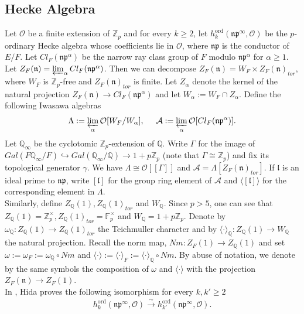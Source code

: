 \documentclass[reqno,10pt]{amsart}
\newcommand{\zp}{\mathbb{Z}_{p}}
\newcommand{\q}{\mathbb{Q}}
\newcommand{\mcO}{\mathcal{O}}
\newcommand{\mcA}{\mathcal{A}}
\newcommand{\p}{\mathfrak{p}}
\newcommand{\n}{\mathfrak{n}}
\newcommand{\ml}{\mathfrak{l}}
\theoremstyle{plain}
\theoremstyle{definition}
\begin{document}
\subsection{Hecke Algebra} \label{HeckeAlgebra}
Let $\mcO$ be a finite extension of $\zp$ and for every $k \geq 2$, let $h_{k}^{\mathrm{ord}}(\n\p^\infty,\mcO)$ be the $p$-ordinary Hecke algebra whose coefficients lie in $\mcO$, where $\n\p$ is the conductor of $E/F$. Let $Cl_F(\n\p^\alpha)$ be the narrow ray class group of $F$ modulo $\n\p^\alpha$ for $\alpha \geq 1$. Let $Z_F(\n) = \varprojlim_{\alpha} Cl_F(\n\p^\alpha)$. Then we can decompose $Z_F(\n) = W_F \times Z_F(\n)_{tor}$, where $W_F$ is $\zp$-free and $Z_F(\n)_{tor}$ is finite. Let $Z_\alpha$ denote the kernel of the natural projection $Z_F(\n) \rightarrow Cl_F(\n\p^\alpha)$ and let $W_\alpha := W_F \cap Z_\alpha$. Define the following Iwasawa algebras
\begin{align*}
    \Lambda := \varprojlim_{\alpha} \mcO[W_F/W_\alpha], \hspace{5mm} \mcA := \varprojlim_{\alpha} \mcO[Cl_F(\n\p^\alpha)].
\end{align*}
Let $\q_\infty$ be the cyclotomic $\zp$-extension of $\q$. Write $\Gamma$ for the image of $Gal(F\q_\infty/F) \hookrightarrow Gal(\q_\infty/\q) \rightarrow 1+p\zp$ (note that $\Gamma \cong \zp$) and fix its topological generator $\gamma$. We have $\Lambda \cong \mcO[[\Gamma]]$ and $\mcA = \Lambda[Z_F(\n)_{tor}]$. If $\ml$ is an ideal prime to $\n\p$, write $[\ml]$ for the group ring element of $\mcA$ and $\langle [\ml] \rangle$ for the corresponding element in $\Lambda$.
\\
Similarly, define $Z_\q(1), Z_\q(1)_{tor}$ and $W_\q$. Since $p > 5$, one can see that $Z_\q(1) = \zp^\times, Z_\q(1)_{tor} = \mathbb{F}_p^\times$ and $W_\q = 1+p\zp$. Denote by $\omega_\q : Z_\q(1) \rightarrow Z_\q(1)_{tor}$ the Teichmuller character and by $\langle \cdot \rangle_\q : Z_\q(1) \rightarrow W_\q$ the natural projection. Recall the norm map, $Nm : Z_F(1) \rightarrow Z_\q(1)$ and set $\omega := \omega_F := \omega_\q \circ Nm$ and $\langle \cdot \rangle := \langle \cdot \rangle_F := \langle \cdot \rangle_\q \circ Nm$. By abuse of notation, we denote by the same symbols the composition of $\omega$ and $\langle \cdot \rangle$ with the projection $Z_F(\n) \rightarrow Z_F(1)$.
\\
In \cite[Theorem 3.2]{Hida1}, Hida proves the following isomorphism for every $k,k' \geq 2$
\begin{align*}
    h_{k}^{\mathrm{ord}}(\n\p^\infty,\mcO) \xrightarrow{\sim} h_{k'}^{\mathrm{ord}}(\n\p^\infty,\mcO).
\end{align*}
\end{document}

